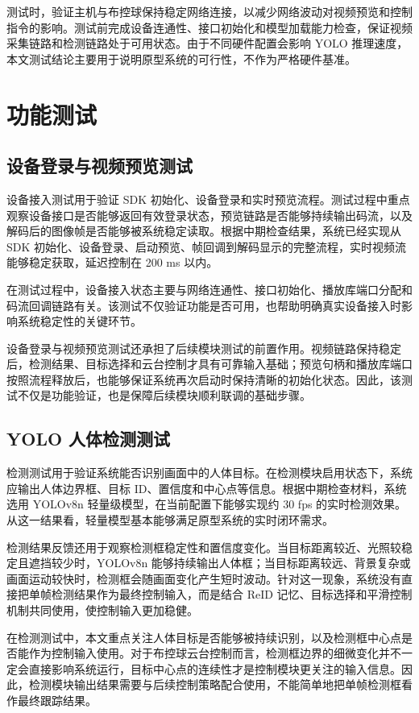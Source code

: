 测试时，验证主机与布控球保持稳定网络连接，以减少网络波动对视频预览和控制指令的影响。测试前完成设备连通性、接口初始化和模型加载能力检查，保证视频采集链路和检测链路处于可用状态。由于不同硬件配置会影响 YOLO 推理速度，本文测试结论主要用于说明原型系统的可行性，不作为严格硬件基准。

\section{功能测试}

\subsection{设备登录与视频预览测试}

设备接入测试用于验证 SDK 初始化、设备登录和实时预览流程。测试过程中重点观察设备接口是否能够返回有效登录状态，预览链路是否能够持续输出码流，以及解码后的图像帧是否能够被系统稳定读取。根据中期检查结果，系统已经实现从 SDK 初始化、设备登录、启动预览、帧回调到解码显示的完整流程，实时视频流能够稳定获取，延迟控制在 200 ms 以内。

在测试过程中，设备接入状态主要与网络连通性、接口初始化、播放库端口分配和码流回调链路有关。该测试不仅验证功能是否可用，也帮助明确真实设备接入时影响系统稳定性的关键环节。

设备登录与视频预览测试还承担了后续模块测试的前置作用。视频链路保持稳定后，检测结果、目标选择和云台控制才具有可靠输入基础；预览句柄和播放库端口按照流程释放后，也能够保证系统再次启动时保持清晰的初始化状态。因此，该测试不仅是功能验证，也是保障后续模块顺利联调的基础步骤。

\subsection{YOLO 人体检测测试}

检测测试用于验证系统能否识别画面中的人体目标。在检测模块启用状态下，系统应输出人体边界框、目标 ID、置信度和中心点等信息。根据中期检查材料，系统选用 YOLOv8n 轻量级模型，在当前配置下能够实现约 30 fps 的实时检测效果。从这一结果看，轻量模型基本能够满足原型系统的实时闭环需求。

检测结果反馈还用于观察检测框稳定性和置信度变化。当目标距离较近、光照较稳定且遮挡较少时，YOLOv8n 能够持续输出人体框；当目标距离较远、背景复杂或画面运动较快时，检测框会随画面变化产生短时波动。针对这一现象，系统没有直接把单帧检测结果作为最终控制输入，而是结合 ReID 记忆、目标选择和平滑控制机制共同使用，使控制输入更加稳健。

在检测测试中，本文重点关注人体目标是否能够被持续识别，以及检测框中心点是否能作为控制输入使用。对于布控球云台控制而言，检测框边界的细微变化并不一定会直接影响系统运行，目标中心点的连续性才是控制模块更关注的输入信息。因此，检测模块输出结果需要与后续控制策略配合使用，不能简单地把单帧检测框看作最终跟踪结果。


